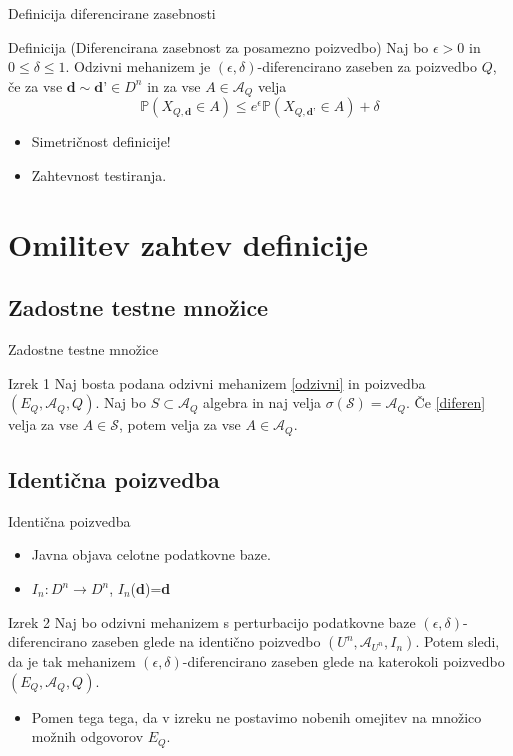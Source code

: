 \documentclass{beamer}
\begin{document}
\begin{frame}{Definicija diferencirane zasebnosti}
\begin{block}{Definicija (Diferencirana zasebnost za posamezno poizvedbo)}
Naj bo $\epsilon > 0$ in $0 \leq \delta \leq 1 $. Odzivni mehanizem je $(\epsilon, \delta)$-diferencirano zaseben za poizvedbo $Q$, če za vse $\textbf{d} \sim \textbf{d'} \in D^n$  in za vse $A\in\mathcal{A}_{Q}$ velja 
\begin{equation}\label{diferen}
\mathbb{P}(X_{Q,\textbf{d}} \in A) \leq e^\epsilon \mathbb{P}(X_{Q,\textbf{d'}} \in A) + \delta \tag{4}
\end{equation}
\end{block}
\begin{itemize}
\item Simetričnost definicije!
\item Zahtevnost testiranja.
\end{itemize}
\end{frame}


\section{Omilitev zahtev definicije}

\subsection{Zadostne testne množice}
\begin{frame}{Zadostne testne množice}
\begin{block}{Izrek 1}
Naj bosta podana odzivni mehanizem \eqref{odzivni} in poizvedba $(E_Q, \mathcal{A}_Q, Q)$. Naj bo $S \subset \mathcal{A}_Q$ algebra in naj velja $\sigma(\mathcal{S}) = \mathcal{A}_Q$. Če \eqref{diferen} velja za vse $A \in \mathcal{S}$, potem velja za vse $A \in \mathcal{A}_Q$. 
\end{block}
\end{frame}

\subsection{Identična poizvedba}
\begin{frame}{Identična poizvedba}
\begin{itemize}
\item Javna objava celotne podatkovne baze.
\item $I_n : D^n \rightarrow D^n$, $I_n$(\textbf{d})=\textbf{d} 
\end{itemize}
\begin{block}{Izrek 2}
Naj bo odzivni mehanizem s perturbacijo podatkovne baze  $(\epsilon , \delta)$-diferencirano zaseben glede na identično poizvedbo $(U^n, \mathcal{A}_{U^n}, I_n)$. Potem sledi, da je tak mehanizem $(\epsilon , \delta)$-diferencirano zaseben glede na katerokoli poizvedbo $(E_Q, \mathcal{A}_Q, Q)$.
\end{block}
\begin{itemize}
\item  Pomen tega tega, da v izreku ne postavimo nobenih omejitev na množico možnih odgovorov $E_Q$. 
\end{itemize}
\end{frame}
\end{document}
